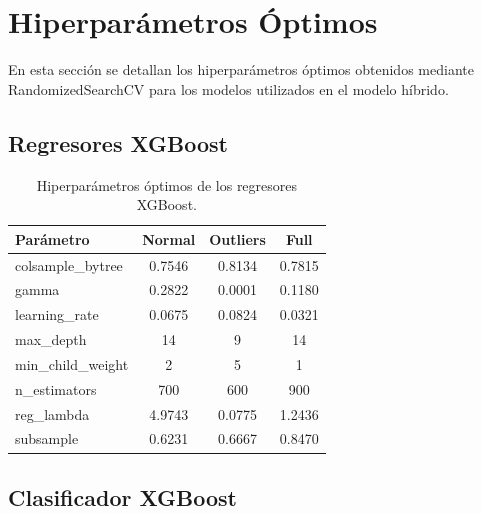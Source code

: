 \documentclass[conference]{IEEEtran}
\begin{document}
    \clearpage
    \appendices
    \section{Hiperparámetros Óptimos}

    En esta sección se detallan los hiperparámetros óptimos obtenidos mediante RandomizedSearchCV para los modelos utilizados en el modelo híbrido.

    \subsection{Regresores XGBoost}

    \begin{table}[H]
        \centering
        \caption{Hiperparámetros óptimos de los regresores XGBoost.}
        \label{tab:xgb_regressors}
        \small
        \begin{tabular}{lccc}
            \toprule
            \textbf{Parámetro} & \textbf{Normal} & \textbf{Outliers} & \textbf{Full} \\
            \midrule
            colsample\_bytree  & 0.7546 & 0.8134 & 0.7815 \\
            gamma              & 0.2822 & 0.0001 & 0.1180 \\
            learning\_rate     & 0.0675 & 0.0824 & 0.0321 \\
            max\_depth         & 14     & 9      & 14 \\
            min\_child\_weight  & 2      & 5      & 1 \\
            n\_estimators      & 700    & 600    & 900 \\
            reg\_lambda        & 4.9743 & 0.0775 & 1.2436 \\
            subsample          & 0.6231 & 0.6667 & 0.8470 \\
            \bottomrule
        \end{tabular}
    \end{table}

    \subsection{Clasificador XGBoost}
\end{document}
